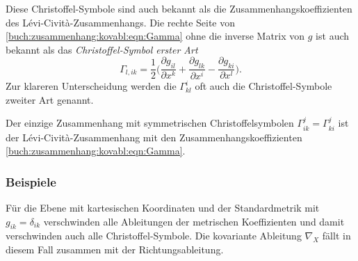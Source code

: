 Diese Christoffel-Symbole sind auch bekannt als die Zusammenhangskoeffizienten
des Lévi-Cività-Zusammenhangs.
Die rechte Seite von \eqref{buch:zusammenhang:kovabl:eqn:Gamma} ohne die
inverse Matrix von $g$ ist auch bekannt als das {\em Christoffel-Symbol
erster Art}
\begin{equation}
\Gamma_{l,ik}
=
\frac12
\biggl(
\frac{\partial g_{il}}{\partial x^k}
+
\frac{\partial g_{lk}}{\partial x^i}
-
\frac{\partial g_{ki}}{\partial x^l}
\biggr)
.
\end{equation}
Zur klareren Unterscheidung werden die $\Gamma^i_{kl}$ oft auch die
Christoffel-Symbole zweiter Art genannt.

\begin{satz}
Der einzige Zusammenhang mit symmetrischen Christoffelsymbolen
$\Gamma^j_{ik}=\Gamma^j_{ki}$ ist der Lévi-Cività-Zusammenhang mit den
Zusammenhangskoeffizienten
\eqref{buch:zusammenhang:kovabl:eqn:Gamma}.
\end{satz}

%
%
\subsubsection{Beispiele}

\begin{beispiel}
Für die Ebene mit kartesischen Koordinaten und der Standardmetrik
mit $g_{ik}=\delta_{ik}$ verschwinden alle Ableitungen der metrischen
Koeffizienten und damit verschwinden auch alle Christoffel-Symbole.
Die kovariante Ableitung $\nabla_X$ fällt in diesem Fall zusammen
mit der Richtungsableitung.
\end{beispiel}

